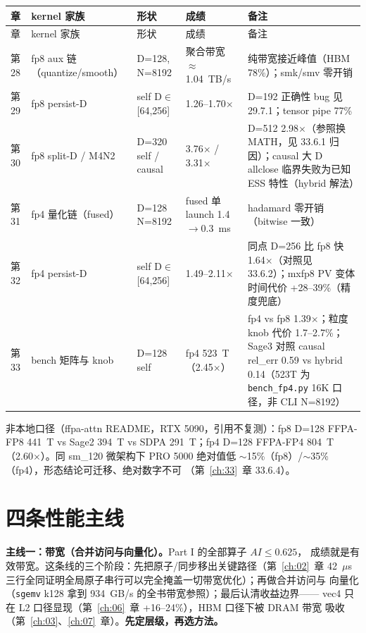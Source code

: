 \begingroup\small
\begin{longtable}{p{1.6cm}p{3.6cm}p{2.6cm}p{3.0cm}p{3.0cm}}
\toprule
章 & kernel 家族 & 形状 & 成绩 & 备注 \\
\midrule
\endfirsthead
\toprule
章 & kernel 家族 & 形状 & 成绩 & 备注 \\
\midrule
\endhead
\endfoot
\bottomrule
\endlastfoot
第28 & fp8 aux 链（quantize/smooth） & D=128, N=8192 & 聚合带宽 $\approx$1.04~TB/s & 纯带宽接近峰值（HBM 78\%）；smk/smv 零开销 \\
第29 & fp8 persist-D & self D$\in$[64,256] & 1.26--1.70$\times$ & D=192 正确性 bug 见 29.7.1；tensor pipe 77\% \\
第30 & fp8 split-D / M4N2 & D=320 self / causal & 3.76$\times$ / 3.31$\times$ & D=512 2.98$\times$（参照换 MATH，见 33.6.1 归因）；causal 大 D allclose 临界失败为已知 ESS 特性（hybrid 解法） \\
第31 & fp4 量化链（fused） & D=128 N=8192 & fused 单 launch 1.4$\to$0.3~ms & hadamard 零开销（bitwise 一致） \\
第32 & fp4 persist-D & self D$\in$[64,256] & 1.49--2.11$\times$ & 同点 D=256 比 fp8 快 1.64$\times$（对照见 33.6.2）；mxfp8 PV 变体时间代价 +28--39\%（精度兜底） \\
第33 & bench 矩阵与 knob & D=128 self & fp4 523~T（2.45$\times$） & fp4 vs fp8 1.39$\times$；粒度 knob 代价 1.7--2.7\%；Sage3 对照 causal rel\_err 0.59 vs hybrid 0.14（523T 为 \texttt{bench\_fp4.py} 16K 口径，非 CLI N=8192） \\
\end{longtable}
\endgroup

\noindent 非本地口径（ffpa-attn README，RTX 5090，引用不复测）：fp8
D=128 FFPA-FP8 441~T vs Sage2 394~T vs SDPA 291~T；fp4 D=128
FFPA-FP4 804~T（2.60$\times$）。同 sm\_120 微架构下 PRO 5000 绝对值低
$\sim$15\%（fp8）/$\sim$35\%（fp4），形态结论可迁移、绝对数字不可
（第~\ref{ch:33}~章 33.6.4）。

\section{四条性能主线}

\textbf{主线一：带宽（合并访问与向量化）。}\allowbreak{}Part I 的全部算子 $AI \le 0.625$，
成绩就是有效带宽。这条线的三个阶段：先把原子/同步移出关键路径（第~\ref{ch:02}~章
42~$\mu$s 三行全同证明全局原子串行可以完全掩盖一切带宽优化）；再做合并访问与
向量化（\texttt{sgemv} k128 拿到 934~GB/s 的全书带宽参照）；最后认清收益边界——
vec4 只在 L2 口径显现（第~\ref{ch:06}~章 +16--24\%），HBM 口径下被 DRAM 带宽
吸收（第~\ref{ch:03}、\ref{ch:07}~章）。\textbf{先定层级，再选方法。}

